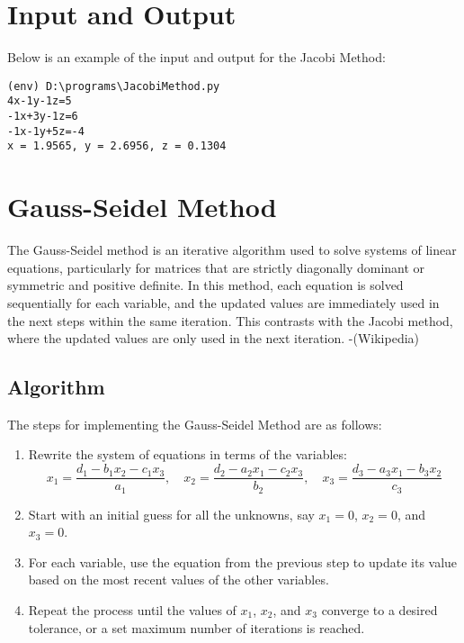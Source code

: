 \documentclass[12pt]{article}
\begin{document}
        \section*{Input and Output}
        \noindent Below is an example of the input and output for the Jacobi Method:

        {\small
        \begin{verbatim}
(env) D:\programs\JacobiMethod.py
4x-1y-1z=5
-1x+3y-1z=6
-1x-1y+5z=-4
x = 1.9565, y = 2.6956, z = 0.1304

        \end{verbatim}
        }


        \newpage        
        \section*{Gauss-Seidel Method}

        The Gauss-Seidel method is an iterative algorithm used to solve systems of linear equations, particularly for matrices that are strictly diagonally dominant or symmetric and positive definite. In this method, each equation is solved sequentially for each variable, and the updated values are immediately used in the next steps within the same iteration. This contrasts with the Jacobi method, where the updated values are only used in the next iteration. -(Wikipedia)
        
        \subsection*{Algorithm}
        The steps for implementing the Gauss-Seidel Method are as follows:
        
        \begin{enumerate}
            \item Rewrite the system of equations in terms of the variables:
            \[
                x_1 = \frac{d_1 - b_1 x_2 - c_1 x_3}{a_1}, \quad x_2 = \frac{d_2 - a_2 x_1 - c_2 x_3}{b_2}, \quad x_3 = \frac{d_3 - a_3 x_1 - b_3 x_2}{c_3}
                \]
                \item Start with an initial guess for all the unknowns, say \(x_1 = 0\), \(x_2 = 0\), and \(x_3 = 0\).
                \item For each variable, use the equation from the previous step to update its value based on the most recent values of the other variables.
                \item Repeat the process until the values of \(x_1\), \(x_2\), and \(x_3\) converge to a desired tolerance, or a set maximum number of iterations is reached.
                
                
    \end{enumerate} 
\end{document}
